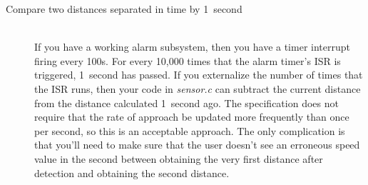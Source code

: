 \begin{description}
    \item[Compare two distances separated in time by 1~second] \phantom{ } \\
        If you have a working alarm subsystem, then you have a timer interrupt firing every 100\textmu s.
        For every 10,000 times that the alarm timer's ISR is triggered, 1~second has passed.
        If you externalize the number of times that the ISR runs, then your code in \textit{sensor.c} can subtract the current distance from the distance calculated 1~second ago.
        The specification does not require that the rate of approach be updated more frequently than once per second, so this is an acceptable approach.
        The only complication is that you'll need to make sure that the user doesn't see an erroneous speed value in the second between obtaining the very first distance after detection and obtaining the second distance.


\end{description}
